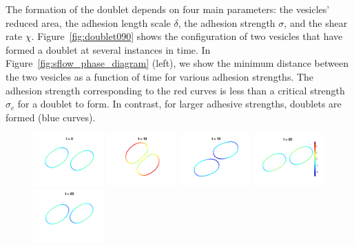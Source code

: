 \documentclass[aps,prl,twocolumn,showpacs,amsmath,amssymb]{revtex4-1}
\begin{document}
The formation of the doublet depends on four main parameters: the
vesicles' reduced area, the adhesion length scale $\delta$, the adhesion
strength $\sigma$, and the shear rate $\chi$.
Figure~\ref{fig:doublet090} shows the configuration of two vesicles that
have formed a doublet at several instances in time.  In
Figure~\ref{fig:sflow_phase_diagram} (left), we show the minimum
distance between the two vesicles as a function of time for various
adhesion strengths.  The adhesion strength corresponding to the red
curves is less than a critical strength $\sigma_c$ for a doublet to
form.  In contrast, for larger adhesive strengths, doublets are formed
(blue curves).

\begin{figure}[htp]
  \includegraphics[width=0.24\textwidth]{figs/adR4em1adS7em1Chi5em1_ra090_image01.png}
  \includegraphics[width=0.24\textwidth]{figs/adR4em1adS7em1Chi5em1_ra090_image02.png}
  \includegraphics[width=0.24\textwidth]{figs/adR4em1adS7em1Chi5em1_ra090_image03.png}
  \includegraphics[width=0.24\textwidth]{figs/adR4em1adS7em1Chi5em1_ra090_image04.png}
  \includegraphics[width=0.24\textwidth]{figs/adR4em1adS7em1Chi5em1_ra090_image05.png}

\end{figure}
\end{document}
